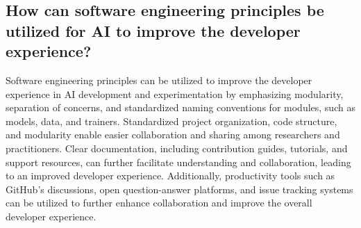\subsection{
How can software engineering principles be utilized for AI to improve the developer experience?
}

Software engineering principles can be utilized to improve the developer experience in AI development and experimentation by emphasizing modularity, separation of concerns, and standardized naming conventions for modules, such as models, data, and trainers. Standardized project organization, code structure, and modularity enable easier collaboration and sharing among researchers and practitioners. Clear documentation, including contribution guides, tutorials, and support resources, can further facilitate understanding and collaboration, leading to an improved developer experience. Additionally, productivity tools such as GitHub's discussions, open question-answer platforms, and issue tracking systems can be utilized to further enhance collaboration and improve the overall developer experience.




